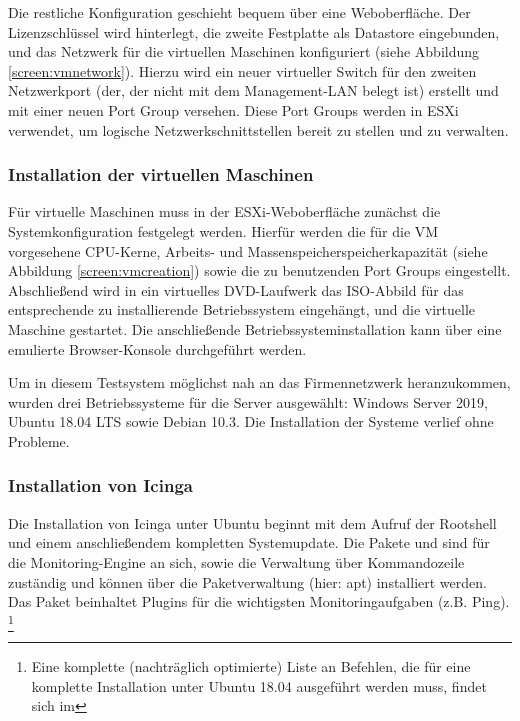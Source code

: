 Die restliche Konfiguration geschieht bequem über eine Weboberfläche. Der Lizenzschlüssel wird hinterlegt, die zweite Festplatte als Datastore eingebunden, und das Netzwerk für die virtuellen Maschinen konfiguriert (siehe Abbildung \ref{screen:vmnetwork}). Hierzu wird ein neuer virtueller Switch für den zweiten Netzwerkport (der, der nicht mit dem Management-LAN belegt ist) erstellt und mit einer neuen Port Group versehen. Diese Port Groups werden in ESXi verwendet, um logische Netzwerkschnittstellen bereit zu stellen und zu verwalten. 

\subsubsection{Installation der virtuellen Maschinen}
\label{sec:InstallationVMs}
Für virtuelle Maschinen muss in der ESXi-Weboberfläche zunächst die Systemkonfiguration festgelegt werden. Hierfür werden die für die VM vorgesehene CPU-Kerne, Arbeits- und Massenspeicherspeicherkapazität (siehe Abbildung \ref{screen:vmcreation}) sowie die zu benutzenden Port Groups eingestellt. Abschließend wird in ein virtuelles DVD-Laufwerk das ISO-Abbild für das entsprechende zu installierende Betriebssystem eingehängt, und die virtuelle Maschine gestartet. Die anschließende Betriebssysteminstallation kann über eine emulierte Browser-Konsole durchgeführt werden.

Um in diesem Testsystem möglichst nah an das Firmennetzwerk heranzukommen, wurden drei Betriebssysteme für die Server ausgewählt: Windows Server 2019, Ubuntu 18.04 LTS sowie Debian 10.3. Die Installation der Systeme verlief ohne Probleme.

\subsubsection{Installation von \glqq{}Icinga\grqq{}}
\label{sec:InstallationIcinga}
Die Installation von \glqq{}Icinga\grqq{} unter Ubuntu beginnt mit dem Aufruf der Rootshell und einem anschließendem kompletten Systemupdate. Die Pakete  und  sind für die Monitoring-Engine an sich, sowie die Verwaltung über Kommandozeile zuständig und können über die Paketverwaltung (hier: apt) installiert werden. Das Paket  beinhaltet Plugins für die wichtigsten Monitoringaufgaben (z.B. Ping).
\footnote{Eine komplette (nachträglich optimierte) Liste an Befehlen, die für eine komplette Installation unter Ubuntu 18.04 ausgeführt werden muss, findet sich im }

